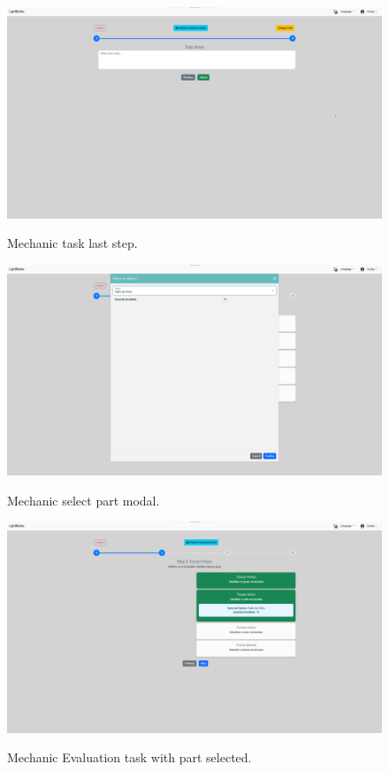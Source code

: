 \begin{figure}[htbp]
  \caption{Mechanic task last step.}
  \centering
  \includegraphics[width=\textwidth]{figs/Implementation/mechanic/MechanicTaskLastStep}
  \label{fig:MechanicTaskLastStep}
\end{figure}




\begin{figure}[htbp]
  \caption{Mechanic select part modal.}
  \centering
  \includegraphics[width=\textwidth]{figs/Implementation/mechanic/MechanicEvaluationSelectTaskWitPart}
  \label{fig:MechanicEvaluationSelectTaskWitPart}
\end{figure}

\begin{figure}[htbp]
  \caption{Mechanic Evaluation task with part selected.}
  \centering
  \includegraphics[width=\textwidth]{figs/Implementation/mechanic/TaskSelected}
  \label{fig:TaskSelected}
\end{figure}



